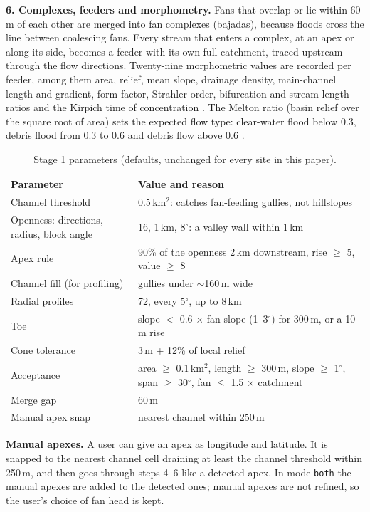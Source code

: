 \documentclass[sigconf,nonacm]{acmart}
\begin{document}
\textbf{6. Complexes, feeders and morphometry.} Fans that overlap or lie within 60\,m of each other are merged into fan complexes (bajadas), because floods cross the line between coalescing fans. Every stream that enters a complex, at an apex or along its side, becomes a feeder with its own full catchment, traced upstream through the flow directions. Twenty-nine morphometric values are recorded per feeder, among them area, relief, mean slope, drainage density, main-channel length and gradient, form factor, Strahler order, bifurcation and stream-length ratios and the Kirpich time of concentration \cite{kirpich1940}. The Melton ratio (basin relief over the square root of area) sets the expected flow type: clear-water flood below 0.3, debris flood from 0.3 to 0.6 and debris flow above 0.6 \cite{wilford2004,descally2010}.

\begin{table}[t]
  \caption{Stage 1 parameters (defaults, unchanged for every site in this paper).}
  \label{tab:stage1}
  \footnotesize
  \begin{tabular}{@{}p{}p{}@{}}
    \toprule
    Parameter & Value and reason \\
    \midrule
    Channel threshold & 0.5\,km$^2$: catches fan-feeding gullies, not hillslopes \\
    Openness: directions, radius, block angle & 16, 1\,km, 8$^\circ$: a valley wall within 1\,km \\
    Apex rule & 90\% of the openness 2\,km downstream, rise $\geq$ 5, value $\geq$ 8 \\
    Channel fill (for profiling) & gullies under $\sim$160\,m wide \\
    Radial profiles & 72, every 5$^\circ$, up to 8\,km \\
    Toe & slope $<$ 0.6 $\times$ fan slope (1--3$^\circ$) for 300\,m, or a 10\,m rise \\
    Cone tolerance & 3\,m + 12\% of local relief \\
    Acceptance & area $\geq$ 0.1\,km$^2$, length $\geq$ 300\,m, slope $\geq$ 1$^\circ$, span $\geq$ 30$^\circ$, fan $\leq$ 1.5 $\times$ catchment \\
    Merge gap & 60\,m \\
    Manual apex snap & nearest channel within 250\,m \\
    \bottomrule
  \end{tabular}
\end{table}

\textbf{Manual apexes.} A user can give an apex as longitude and latitude. It is snapped to the nearest channel cell draining at least the channel threshold within 250\,m, and then goes through steps 4--6 like a detected apex. In mode \texttt{both} the manual apexes are added to the detected ones; manual apexes are not refined, so the user's choice of fan head is kept.
\end{document}
